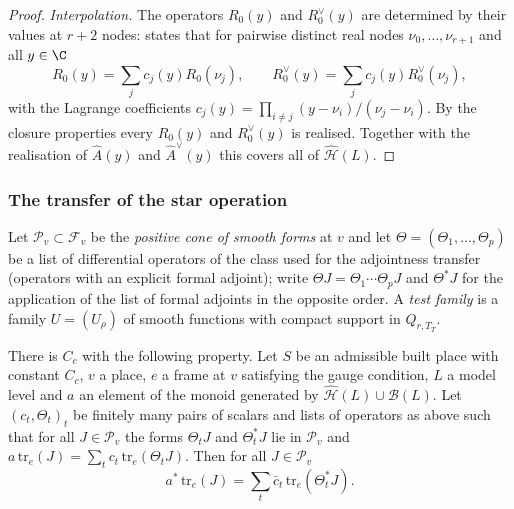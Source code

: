 \begin{proof}
\emph{Interpolation.} The operators $R_0(y)$ and $R_0^\vee(y)$ are determined by their values at $r+2$ nodes:
 states that for pairwise distinct real nodes
$\nu_0,\dots,\nu_{r+1}$ and all $y\in\C$
\[
R_0(y)=\sum_jc_j(y)R_0(\nu_j),\qquad R_0^\vee(y)=\sum_jc_j(y)R_0^\vee(\nu_j),
\]
with the Lagrange coefficients $c_j(y)=\prod_{i\ne j}(y-\nu_i)/(\nu_j-\nu_i)$. By the closure properties every $R_0(y)$ and
$R_0^\vee(y)$ is realised. Together with the realisation of $\widehat A(y)$ and $\widehat A^\vee(y)$ this covers all of
$\widehat{\mathcal H}(L)$.
\end{proof}

\subsubsection{The transfer of the star operation}

Let $\mathcal P_v\subset\mathcal F_v$ be the \emph{positive cone of smooth forms} at $v$ and let $\Theta=(\Theta_1,\dots,
\Theta_p)$ be a list of differential operators of the class used for the adjointness transfer (operators with an explicit
formal adjoint); write $\Theta J=\Theta_1\cdots\Theta_pJ$ and $\Theta^*J$ for the application of the list of formal adjoints
in the opposite order. A \emph{test family} is a family $U=(U_\rho)$ of smooth functions with compact support in
$Q_{r,T_T}$.

\begin{theorem}\label{pf:thmS-carrier:startransfer}
There is $C_c$ with the following property. Let $S$ be an admissible built place with constant $C_c$, $v$ a place, $e$ a
frame at $v$ satisfying the gauge condition, $L$ a model level and $a$ an element of the monoid generated by
$\widehat{\mathcal H}(L)\cup\mathcal B(L)$. Let $(c_t,\Theta_t)_t$ be finitely many pairs of scalars and lists of operators
as above such that for all $J\in\mathcal P_v$ the forms $\Theta_tJ$ and $\Theta_t^*J$ lie in $\mathcal P_v$ and
$a\,\mathrm{tr}_e(J)=\sum_tc_t\,\mathrm{tr}_e(\Theta_tJ)$. Then for all $J\in\mathcal P_v$
\[
a^*\,\mathrm{tr}_e(J)=\sum_t\bar c_t\,\mathrm{tr}_e(\Theta_t^*J).
\]
\end{theorem}

